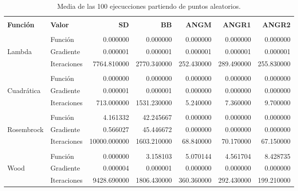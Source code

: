 \begin{table}[H]
    \changefontsizes{10pt}
    \centering
    \begin{tabular}{llrrrrr}
        \hline                                                                                                           \\
        \textbf{Función} & \textbf{Valor} & \textbf{SD}  & \textbf{BB} & \textbf{ANGM} & \textbf{ANGR1} & \textbf{ANGR2} \\[0.1cm]\hline
        \\
                         & Función        & 0.000000     & 0.000000    & 0.000000      & 0.000000       & 0.000000       \\[0.25cm]
        Lambda           & Gradiente      & 0.000001     & 0.000001    & 0.000001      & 0.000001       & 0.000001       \\[0.25cm]
                         & Iteraciones    & 7764.810000  & 2770.340000 & 252.430000    & 289.490000     & 255.830000     \\[0.25cm]\hline
        \\
                         & Función        & 0.000000     & 0.000000    & 0.000000      & 0.000000       & 0.000000       \\[0.25cm]
        Cuadrática       & Gradiente      & 0.000001     & 0.000001    & 0.000000      & 0.000000       & 0.000000       \\[0.25cm]
                         & Iteraciones    & 713.000000   & 1531.230000 & 5.240000      & 7.360000       & 9.700000       \\[0.25cm]\hline
        \\
                         & Función        & 4.161332     & 42.245667   & 0.000000      & 0.000000       & 0.000000       \\[0.25cm]
        Rosembrock       & Gradiente      & 0.566027     & 45.446672   & 0.000000      & 0.000000       & 0.000000       \\[0.25cm]
                         & Iteraciones    & 10000.000000 & 1603.210000 & 68.840000     & 70.170000      & 67.150000      \\[0.25cm]\hline
        \\
                         & Función        & 0.000000     & 3.158103    & 5.070144      & 4.561704       & 8.428735       \\[0.25cm]
        Wood             & Gradiente      & 0.000004     & 0.000001    & 0.000000      & 0.000000       & 0.000000       \\[0.25cm]
                         & Iteraciones    & 9428.690000  & 1806.430000 & 360.360000    & 292.430000     & 199.210000     \\[0.25cm]\hline
    \end{tabular}
    \caption{Media de las 100 ejecucciones partiendo de puntos aleatorios.}
\end{table}